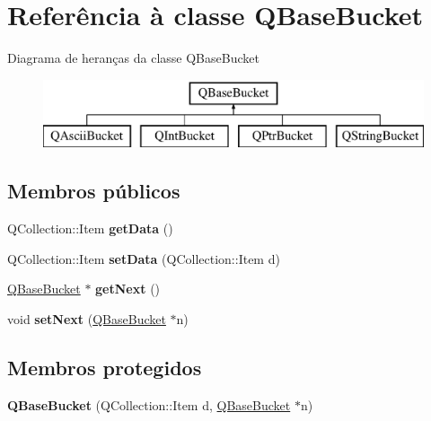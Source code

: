 \hypertarget{class_q_base_bucket}{\section{Referência à classe Q\-Base\-Bucket}
\label{class_q_base_bucket}
}
Diagrama de heranças da classe Q\-Base\-Bucket\begin{figure}[H]
\begin{center}
\leavevmode
\includegraphics[height=2.000000cm]{class_q_base_bucket}
\end{center}
\end{figure}
\subsection*{Membros públicos}
\begin{DoxyCompactItemize}
\item 
\hypertarget{class_q_base_bucket_ad19a53b08099dc8fae156c9d91586f34}{Q\-Collection\-::\-Item {\bfseries get\-Data} ()}\label{class_q_base_bucket_ad19a53b08099dc8fae156c9d91586f34}

\item 
\hypertarget{class_q_base_bucket_a7aabe5870492e573dc8d60e60295a1a6}{Q\-Collection\-::\-Item {\bfseries set\-Data} (Q\-Collection\-::\-Item d)}\label{class_q_base_bucket_a7aabe5870492e573dc8d60e60295a1a6}

\item 
\hypertarget{class_q_base_bucket_a1e3b317b5937092d9c055b2b750babe2}{\hyperlink{class_q_base_bucket}{Q\-Base\-Bucket} $\ast$ {\bfseries get\-Next} ()}\label{class_q_base_bucket_a1e3b317b5937092d9c055b2b750babe2}

\item 
\hypertarget{class_q_base_bucket_a21252db304576d02acd82ef113bca56a}{void {\bfseries set\-Next} (\hyperlink{class_q_base_bucket}{Q\-Base\-Bucket} $\ast$n)}\label{class_q_base_bucket_a21252db304576d02acd82ef113bca56a}

\end{DoxyCompactItemize}
\subsection*{Membros protegidos}
\begin{DoxyCompactItemize}
\item 
\hypertarget{class_q_base_bucket_ae7c378d0ce20a991448319ebd6970cef}{{\bfseries Q\-Base\-Bucket} (Q\-Collection\-::\-Item d, \hyperlink{class_q_base_bucket}{Q\-Base\-Bucket} $\ast$n)}\label{class_q_base_bucket_ae7c378d0ce20a991448319ebd6970cef}

\end{DoxyCompactItemize}
